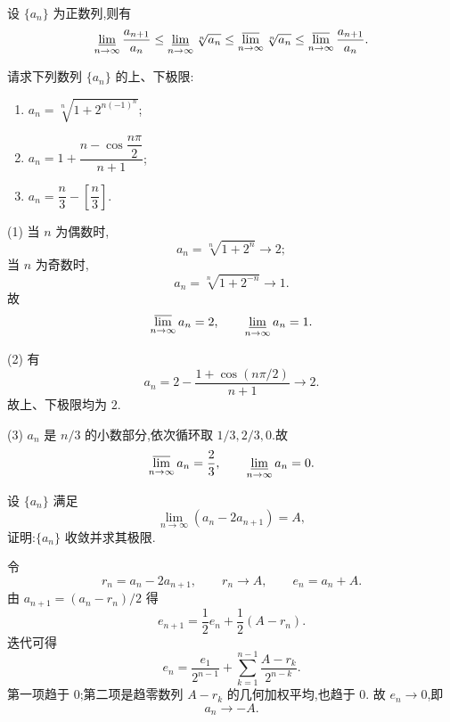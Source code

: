 \begin{proposition}[\markstar]
  设 $\{a_n\}$ 为正数列,则有
  \[
    \varliminf\limits_{n\to\infty}\dfrac{a_{n+1}}{a_n}
    \leq
    \varliminf\limits_{n\to\infty}\sqrt[n]{a_n}
    \leq
    \varlimsup\limits_{n\to\infty}\sqrt[n]{a_n}
    \leq
    \varlimsup\limits_{n\to\infty}\dfrac{a_{n+1}}{a_n}.
  \]
\end{proposition}

\begin{example}
  请求下列数列 $\{a_n\}$ 的上、下极限:
  \begin{enumerate}
    \item $\displaystyle a_n=\sqrt[n]{1+2^{n(-1)^n}}$;
    \item $\displaystyle a_n=1+\dfrac{n-\cos\dfrac{n\pi}{2}}{n+1}$;
    \item $\displaystyle a_n=\dfrac{n}{3}-\left[\dfrac{n}{3}\right]$.
  \end{enumerate}
\end{example}
\exampleblank

\begin{solution}
  (1) 当 $n$ 为偶数时,
  \[
    a_n=\sqrt[n]{1+2^n}\longrightarrow2;
  \]
  当 $n$ 为奇数时,
  \[
    a_n=\sqrt[n]{1+2^{-n}}\longrightarrow1.
  \]
  故
  \[
    \varlimsup\limits_{n\to\infty}a_n=2,
    \qquad
    \varliminf\limits_{n\to\infty}a_n=1.
  \]

  (2) 有
  \[
    a_n=2-\dfrac{1+\cos(n\pi/2)}{n+1}\longrightarrow2.
  \]
  故上、下极限均为 $2$.

  (3) $a_n$ 是 $n/3$ 的小数部分,依次循环取 $1/3,2/3,0$.故
  \[
    \varlimsup\limits_{n\to\infty}a_n=\dfrac{2}{3},
    \qquad
    \varliminf\limits_{n\to\infty}a_n=0.
  \]
\end{solution}

\begin{example}
  设 $\{a_n\}$ 满足
  \[
    \lim\limits_{n\to\infty}(a_n-2a_{n+1})=A,
  \]
  证明:$\{a_n\}$ 收敛并求其极限.
\end{example}
\exampleblank

\begin{solution}
  令
  \[
    r_n=a_n-2a_{n+1},
    \qquad r_n\to A,
    \qquad e_n=a_n+A.
  \]
  由 $a_{n+1}=(a_n-r_n)/2$ 得
  \[
    e_{n+1}=\dfrac{1}{2}e_n+\dfrac{1}{2}(A-r_n).
  \]
  迭代可得
  \[
    e_n=\dfrac{e_1}{2^{n-1}}
    +\sum\limits_{k=1}^{n-1}\dfrac{A-r_k}{2^{n-k}}.
  \]
  第一项趋于 $0$;第二项是趋零数列 $A-r_k$ 的几何加权平均,也趋于 $0$.
  故 $e_n\to0$,即
  \[
    a_n\longrightarrow-A.
  \]
\end{solution}

